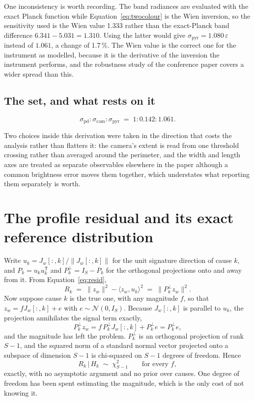 \documentclass[preprint,12pt]{elsarticle}
\begin{document}
One inconsistency is worth recording. The band radiances are evaluated with the
exact Planck function while Equation~\eqref{eq:twocolour} is the Wien inversion,
so the sensitivity used is the Wien value 1.333 rather than the exact-Planck
band difference $6.341 - 5.031 = 1.310$. Using the latter would give
$\sigma_{\mathrm{pyr}} = 1.080\,\varepsilon$ instead of $1.061$, a change of
1.7\,\%. The Wien value is the correct one for the instrument as modelled,
because it is the derivative of the inversion the instrument performs, and the
robustness study of the conference paper covers a wider spread than this.

\subsection{The set, and what rests on it}

\begin{equation}
\sigma_{\mathrm{pd}} : \sigma_{\mathrm{cam}} : \sigma_{\mathrm{pyr}}
\;=\; 1 : 0.142 : 1.061 .
\end{equation}

Two choices inside this derivation were taken in the direction that costs the
analysis rather than flatters it: the camera's extent is read from one threshold
crossing rather than averaged around the perimeter, and the width and length
axes are treated as separate observables elsewhere in the paper although a
common brightness error moves them together, which understates what reporting
them separately is worth.


\section{The profile residual and its exact reference distribution}
\label{app:resid}

Write $u_k = J_w[:,k] / \lVert J_w[:,k] \rVert$ for the unit signature direction
of cause $k$, and $P_k = u_k u_k^{\mathsf T}$ and
$P_k^{\perp} = I_S - P_k$ for the orthogonal projections onto and away from it.
From Equation~\eqref{eq:resid},
%
\begin{equation}
R_k \;=\; \lVert z_w \rVert^2 - \langle z_w, u_k \rangle^2
     \;=\; \lVert P_k^{\perp} z_w \rVert^2 .
\end{equation}
%
Now suppose cause $k$ is the true one, with any magnitude $f$, so that
$z_w = f J_w[:,k] + e$ with $e \sim \mathcal{N}(0, I_S)$. Because
$J_w[:,k]$ is parallel to $u_k$, the projection annihilates the signal term
exactly,
%
\begin{equation}
P_k^{\perp} z_w = f\,P_k^{\perp} J_w[:,k] + P_k^{\perp} e = P_k^{\perp} e ,
\end{equation}
%
and the magnitude has left the problem. $P_k^{\perp}$ is an orthogonal
projection of rank $S-1$, and the squared norm of a standard normal vector
projected onto a subspace of dimension $S-1$ is chi-squared on $S-1$ degrees of
freedom. Hence
%
\begin{equation}
R_k \,\big|\, H_k \;\sim\; \chi^2_{S-1}
\qquad\text{for every } f ,
\end{equation}
%
exactly, with no asymptotic argument and no prior over causes. One degree of
freedom has been spent estimating the magnitude, which is the only cost of not
knowing it.
\end{document}
